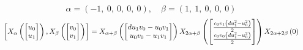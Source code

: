 \documentclass[11pt]{article}
\theoremstyle{definition}
\begin{document}
\[
\alpha = \left( -1, \  0, \  0, \  0, \  0\right), \quad \beta = \left( 1, \  1, \  0, \  0, \  0\right)
\]
\[
\scaletoalign{\textwidth}{\left[ X_{\alpha}\left(\left[\begin{matrix}u_{0}\\u_{1}\end{matrix}\right]\right), X_{\beta}\left(\left[\begin{matrix}v_{0}\\v_{1}\end{matrix}\right]\right) \right] = X_{\alpha + \beta}\left(\left[\begin{matrix}d u_{1} v_{0} - u_{0} v_{1}\\u_{0} v_{0} - u_{1} v_{1}\end{matrix}\right]\right) X_{2\alpha + \beta}\left(\left[\begin{matrix}\frac{c_{0} v_{1} \left(d u_{1}^{2} - u_{0}^{2}\right)}{2}\\\frac{c_{0} v_{0} \left(d u_{1}^{2} - u_{0}^{2}\right)}{2}\end{matrix}\right]\right) X_{2\alpha + 2\beta}\left(0\right)}
\]
\end{document}

